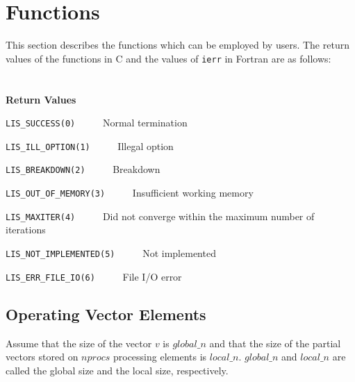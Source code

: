 \documentclass[a4paper]{article}
\newcommand{\namelistlabel}[1]{\mbox{#1}\hfill}
\newenvironment{namelist}[1]{%
 \begin{list}{}
  {\let\makelabel\namelistlabel
  \settowidth{\labelwidth}{#1}
  \setlength{\leftmargin}{1.1\labelwidth}}
}{%
\end{list}}
\begin{document}
\newpage
\section{Functions}\label{sec:func}
This section describes the functions which can be employed by users.
The return values of the functions in C and the values of {\tt ierr} in Fortran are as 
follows: 
\\ \\ \\
{\bf Return Values}
\begin{namelist}{XXXXXXXXXXXXXXXXXXXX}
\item[\tt LIS\_SUCCESS(0)] ~~~~~Normal termination
\item[\tt LIS\_ILL\_OPTION(1)] ~~~~~Illegal option
\item[\tt LIS\_BREAKDOWN(2)] ~~~~~Breakdown
\item[\tt LIS\_OUT\_OF\_MEMORY(3)] ~~~~~Insufficient working memory
\item[\tt LIS\_MAXITER(4)] ~~~~~Did not converge within the maximum number of iterations
\item[\tt LIS\_NOT\_IMPLEMENTED(5)] ~~~~~Not implemented
\item[\tt LIS\_ERR\_FILE\_IO(6)] ~~~~~File I/O error
\end{namelist}

\subsection{Operating Vector Elements}
Assume that the size of the vector $v$ is $global\_n$ and that the size
of the partial vectors stored on $nprocs$ processing elements 
is $local\_n$. $global\_n$ and $local\_n$ 
are called the global size and the local size, respectively.
\end{document}
